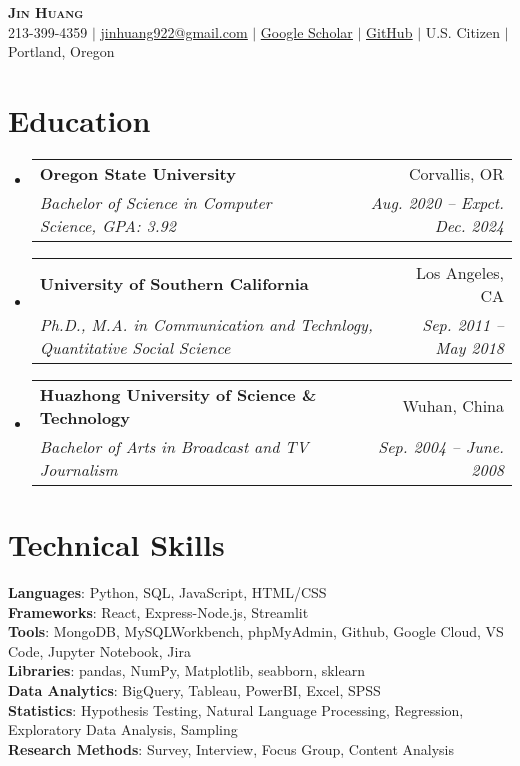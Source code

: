 \documentclass[letterpaper,11pt]{article}
\makeatletter
\newcommand{\resumeSubheading}[4]{
  \vspace{-2pt}\item
    \begin{tabular*}{0.97\textwidth}[t]{l@{\extracolsep{\fill}}r}
      \textbf{#1} & #2 \\
      \textit{\small#3} & \textit{\small #4} \\
    \end{tabular*}\vspace{-7pt}
}
\newcommand{\resumeSubHeadingListStart}{\begin{itemize}[leftmargin=0.15in, label={}]}
\newcommand{\resumeSubHeadingListEnd}{\end{itemize}}
\makeatother
\begin{document}

\begin{center}
    \textbf{\Huge \scshape Jin Huang} \\ \vspace{1pt}
    \small 213-399-4359 $|$ \href{mailto:jinhuang922@gmail.com}{\underline{jinhuang922@gmail.com}} $|$ 
    \href{https://scholar.google.com/citations?user=V9IzEq8AAAAJ&hl=en}{\underline{Google Scholar}} $|$
    \href{https://github.com/JinHuang0101}{\underline{GitHub}}
    $|$
    U.S. Citizen
    $|$
    Portland, Oregon
\end{center}


\section{Education}
  \resumeSubHeadingListStart
    \resumeSubheading
      {Oregon State University}{Corvallis, OR}
      {Bachelor of Science in Computer Science, GPA: 3.92}{Aug. 2020 -- Expct. Dec. 2024}
    \resumeSubheading
      {University of Southern California}{Los Angeles, CA}
      {Ph.D., M.A. in Communication and Technlogy, Quantitative Social Science}{Sep. 2011 -- May 2018}
    \resumeSubheading
      {Huazhong University of Science \& Technology}{Wuhan, China}
      {Bachelor of Arts in Broadcast and TV Journalism}{Sep. 2004 -- June. 2008}
  \resumeSubHeadingListEnd

\section{Technical Skills}
 \begin{itemize}[leftmargin=0.15in, label={}]
   \small{\item{
     \textbf{Languages}{: Python, SQL, JavaScript, HTML/CSS} \\
     \textbf{Frameworks}{: React, Express-Node.js, Streamlit} \\
     \textbf{Tools}{: MongoDB, MySQLWorkbench, phpMyAdmin, Github, Google Cloud, VS Code, Jupyter Notebook, Jira} \\
     \textbf{Libraries}{: pandas, NumPy, Matplotlib, seabborn, sklearn}\\
     \textbf{Data Analytics}{: BigQuery, Tableau, PowerBI, Excel, SPSS}\\
     \textbf{Statistics}{: Hypothesis Testing, Natural Language Processing, Regression, Exploratory Data Analysis, Sampling}\\
     \textbf{Research Methods}{: Survey, Interview, Focus Group, Content Analysis}
    }}
 \end{itemize}
\end{document}
